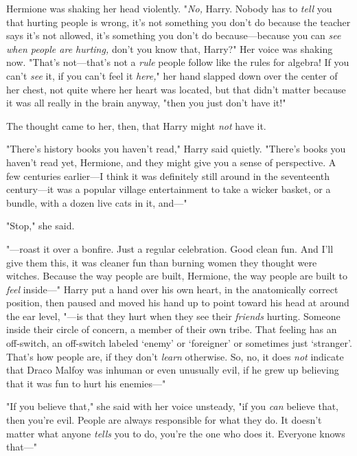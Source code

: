 Hermione was shaking her head violently. "\emph{No,} Harry. Nobody has to 
\emph{tell} you that hurting people is wrong, it's not something you don't do 
because the teacher says it's not allowed, it's something you don't do 
because---because you can \emph{see when people are hurting,} don't you know 
that, Harry?" Her voice was shaking now. "That's not---that's not a \emph{rule} 
people follow like the rules for algebra! If you can't \emph{see} it, if you 
can't feel it \emph{here,}" her hand slapped down over the center of her chest, 
not quite where her heart was located, but that didn't matter because it was 
all really in the brain anyway, "then you just don't have it!"

The thought came to her, then, that Harry might \emph{not} have it.

"There's history books you haven't read," Harry said quietly. "There's books 
you haven't read yet, Hermione, and they might give you a sense of perspective. 
A few centuries earlier---I think it was definitely still around in the 
seventeenth century---it was a popular village entertainment to take a wicker 
basket, or a bundle, with a dozen live cats in it, and---"

"Stop," she said.

"---roast it over a bonfire. Just a regular celebration. Good clean fun. And 
I'll give them this, it was cleaner fun than burning women they thought were 
witches. Because the way people are built, Hermione, the way people are built 
to \emph{feel} inside---" Harry put a hand over his own heart, in the 
anatomically correct position, then paused and moved his hand up to point 
toward his head at around the ear level, "---is that they hurt when they see 
their \emph{friends} hurting. Someone inside their circle of concern, a member 
of their own tribe. That feeling has an off-switch, an off-switch labeled 
`enemy' or `foreigner' or sometimes just `stranger'. That's how people are, if 
they don't \emph{learn} otherwise. So, no, it does \emph{not} indicate that 
Draco Malfoy was inhuman or even unusually evil, if he grew up believing that 
it was fun to hurt his enemies---"

"If you believe that\emph{,}" she said with her voice unsteady, "if you 
\emph{can} believe that, then you're evil. People are always responsible for 
what they do. It doesn't matter what anyone \emph{tells} you to do, you're the 
one who does it. Everyone knows that---"

